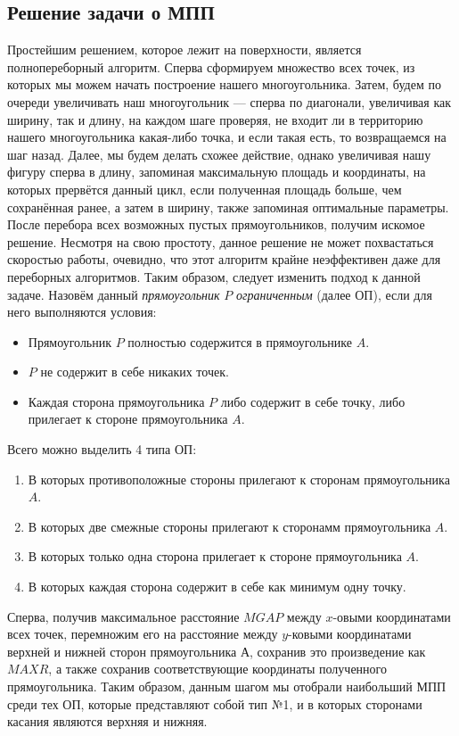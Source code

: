 \documentclass[12pt,a4paper]{article}
\begin{document}
{\subsection{Решение задачи о МПП}
Простейшим решением, которое лежит на поверхности, является полнопереборный алгоритм. Сперва сформируем множество всех точек, из которых мы можем начать построение нашего многоугольника. Затем, будем по очереди увеличивать наш многоугольник — сперва по диагонали, увеличивая как ширину, так и длину, на каждом шаге проверяя, не входит ли в территорию нашего многоугольника какая-либо точка, и если такая есть, то возвращаемся на шаг назад. Далее, мы будем делать схожее действие, однако увеличивая нашу фигуру сперва в длину, запоминая максимальную площадь и координаты, на которых прервётся данный цикл, если полученная площадь больше, чем сохранённая ранее, а затем в ширину, также запоминая оптимальные параметры. После перебора всех возможных пустых прямоугольников, получим искомое решение. \newline
Несмотря на свою простоту, данное решение не может похвастаться скоростью работы, очевидно, что этот алгоритм крайне неэффективен даже для переборных алгоритмов. Таким образом, следует изменить подход к данной задаче. \newline
Назовём данный \textit{прямоугольник} $P$ \textit{ограниченным} (далее ОП), если для него выполняются условия:
\begin{itemize}
\item Прямоугольник $P$ полностью содержится в прямоугольнике $A$.
\item $P$ не содержит в себе никаких точек.
\item Каждая сторона прямоугольника $P$ либо содержит в себе точку, либо прилегает к стороне прямоугольника $A$.
\end{itemize}
Всего можно выделить 4 типа ОП:
\begin{enumerate}
\item В которых противоположные стороны прилегают к сторонам прямоугольника $A$.
\item В которых две смежные стороны прилегают к сторонамм прямоугольника $A$.
\item В которых только одна сторона прилегает к стороне прямоугольника $A$.
\item В которых каждая сторона содержит в себе как минимум одну точку.
\end{enumerate}
Сперва, получив максимальное расстояние $MGAP$ между $x$-овыми координатами всех точек, перемножим его на расстояние между $y$-ковыми координатами верхней и нижней сторон прямоугольника $А$, сохранив это произведение как $MAXR$, а также сохранив соответствующие координаты полученного прямоугольника. Таким образом, данным шагом мы отобрали наибольший МПП среди тех ОП, которые представляют собой тип №1, и в которых сторонами касания являются верхняя и нижняя. \\
}
\end{document}
